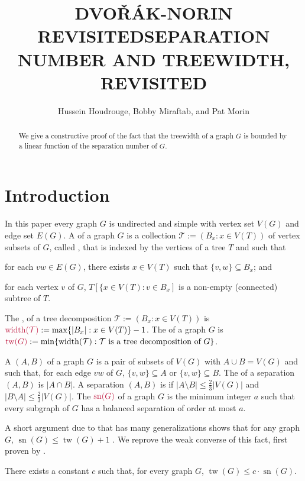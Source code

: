 \documentclass{patmorin}
\title{\MakeUppercase{Dvo\v{r}ák-Norin Revisited}}
\title{\MakeUppercase{Separation Number and Treewidth, Revisited}}
\author{Hussein Houdrouge, Bobby Miraftab, and Pat Morin}
\date{}
\DeclareMathOperator{\sep}{sn}
\DeclareMathOperator{\tw}{tw}
\DeclareMathOperator{\width}{width}
\begin{document}
\maketitle

\begin{abstract}
  We give a constructive proof of the fact that the treewidth of a graph $G$ is bounded by a linear function of the separation number of $G$.
\end{abstract}


\section{Introduction}

In this paper every graph $G$ is undirected and simple with vertex set $V(G)$ and edge set $E(G)$.  A  of a graph $G$ is a collection $\mathcal{T}:=(B_x:x\in V(T))$ of vertex subsets of $G$, called , that is indexed by the vertices of a tree $T$ and such that
\begin{enumerate*}[label=(\roman*)]
  \item\label{covers_edges} for each $vw\in E(G)$, there exists $x\in V(T)$ such that $\{v,w\}\subseteq B_x$; and
  \item\label{connectivity} for each vertex $v$ of $G$, $T[\{x\in V(T): v\in B_x]$ is a non-empty (connected) subtree of $T$.
\end{enumerate*}
The , of a tree decomposition $\mathcal{T}:=(B_x:x\in V(T))$ is $\mathdefin{\width(\mathcal{T})}:=\max\{|B_x|:x\in V(T)\}-1$. The  of a graph $G$ is $\mathdefin{\tw(G)}:=\min\{\width(\mathcal{T}):\text{$\mathcal{T}$ is a tree decomposition of $G$}\}$.

A  $(A,B)$ of a graph $G$ is a pair of subsets of $V(G)$ with $A\cup B= V(G)$ and such that, for each edge $vw$ of $G$, $\{v,w\}\subseteq A$ or $\{v,w\}\subseteq B$.  The  of a separation $(A,B)$ is $|A\cap B|$.  A separation $(A,B)$ is  if $|A\setminus B|\le \tfrac{2}{3}|V(G)|$ and $|B\setminus A|\le \tfrac{2}{3}|V(G)|$.  The  $\mathdefin{\sep(G)}$ of a graph $G$ is the minimum integer $a$ such that every subgraph of $G$ has a balanced separation of order at most $a$.

A short argument due to \citet{robertson.seymour:graph} that has many generalizations shows that for any graph $G$, $\sep(G)\le \tw(G)+1$ .  We reprove the weak converse of this fact, first proven by \citet{dvorak.norin:treewidth}.
\begin{thm}\label{main_result}
  There exists a constant $c$ such that, for every graph $G$, $\tw(G)\le c\cdot \sep(G)$.
\end{thm}
\end{document}
